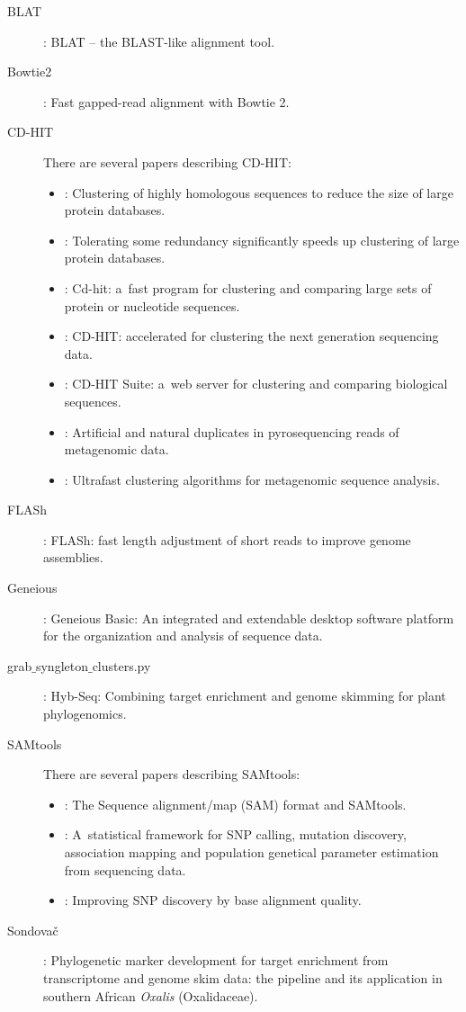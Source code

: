 \documentclass[a4paper, 11pt, twoside]{article}
\begin{document}
\begin{description}
 \item[BLAT] \citet{Kent2002}: BLAT -- the BLAST-like alignment tool.
 \item[Bowtie2] \citet{Langmead2012}: Fast gapped-read alignment with Bowtie 2.
 \item[CD-HIT] There are several papers describing CD-HIT:
  \begin{itemize}
    \item \citet{Li2001}: Clustering of highly homologous sequences to reduce the size of large protein databases.
    \item \citet{Li2002}: Tolerating some redundancy significantly speeds up clustering of large protein databases.
    \item \citet{Li2006}: Cd-hit: a~fast program for clustering and comparing large sets of protein or nucleotide sequences.
    \item \citet{Fu2012}: CD-HIT: accelerated for clustering the next generation sequencing data.
    \item \citet{Huang2010}: CD-HIT Suite: a~web server for clustering and comparing biological sequences.
    \item \citet{Niu2010}: Artificial and natural duplicates in pyrosequencing reads of metagenomic data.
    \item \citet{Li2012b}: Ultrafast clustering algorithms for metagenomic sequence analysis.
   \end{itemize}
 \item[FLASh] \citet{Magoc2011}: FLASh: fast length adjustment of short reads to improve genome assemblies.
 \item[Geneious] \citet{Kearse2012}: Geneious Basic: An integrated and extendable desktop software platform for the organization and analysis of sequence data.
 \item[grab$\_$syngleton$\_$clusters.py] \citet{Weitemier2014}: Hyb-Seq: Combining target enrichment and genome skimming for plant phylogenomics.
 \item[SAMtools] There are several papers describing SAMtools:
  \begin{itemize}
   \item \citet{Li2009}: The Sequence alignment/map (SAM) format and SAMtools.
   \item \citet{Li2011}: A~statistical framework for SNP calling, mutation discovery, association mapping and population genetical parameter estimation from sequencing data.
   \item \citet{Li2011a}: Improving SNP discovery by base alignment quality.
  \end{itemize}
 \item[Sondovač] \citet{Schmickl2016}: Phylogenetic marker development for target enrichment from transcriptome and genome skim data: the pipeline and its application in southern African \textit{Oxalis} (Oxalidaceae).
\end{description}
\end{document}
